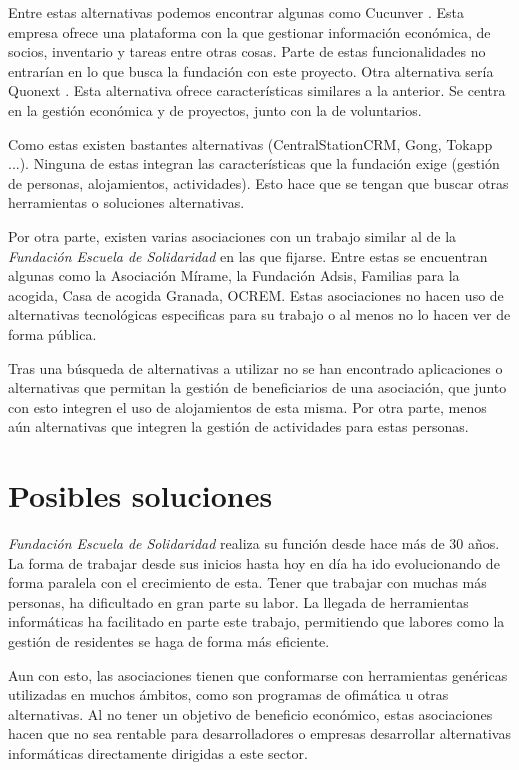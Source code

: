 Entre estas alternativas podemos encontrar algunas como Cucunver \cite{cucunver}. Esta empresa ofrece una plataforma con la que gestionar información económica, de socios, inventario y tareas entre otras cosas. Parte de estas funcionalidades no entrarían en lo que busca la fundación con este proyecto. Otra alternativa sería Quonext \cite{quonext}. Esta alternativa ofrece características similares a la anterior. Se centra en la gestión económica y de proyectos, junto con la de voluntarios.

Como estas existen bastantes alternativas (CentralStationCRM, Gong, Tokapp ...). Ninguna de estas integran las características que la fundación exige (gestión de personas, alojamientos, actividades). Esto hace que se tengan que buscar otras herramientas o soluciones alternativas. 

Por otra parte, existen varias asociaciones con un trabajo similar al de la \textit{Fundación Escuela de Solidaridad} en las que fijarse. Entre estas se encuentran algunas como la Asociación Mírame, la Fundación Adsis, Familias para la acogida, Casa de acogida Granada, OCREM. Estas asociaciones no hacen uso de alternativas tecnológicas especificas para su trabajo o al menos no lo hacen ver de forma pública. 

Tras una búsqueda de alternativas a utilizar no se han encontrado aplicaciones o alternativas que permitan la gestión de beneficiarios de una asociación, que junto con esto integren el uso de alojamientos de esta misma. Por otra parte, menos aún alternativas que integren la gestión de actividades para estas personas.

\section{Posibles soluciones}

\textit{Fundación Escuela de Solidaridad} realiza su función desde hace más de 30 años. La forma de trabajar desde sus inicios hasta hoy en día ha ido evolucionando de forma paralela con el crecimiento de esta. Tener que trabajar con muchas más personas, ha dificultado en gran parte su labor. La llegada de herramientas informáticas ha facilitado en parte este trabajo, permitiendo que labores como la gestión de residentes se haga de forma más eficiente. 

Aun con esto, las asociaciones tienen que conformarse con herramientas genéricas utilizadas en muchos ámbitos, como son programas de ofimática u otras alternativas. Al no tener un objetivo de beneficio económico, estas asociaciones hacen que no sea rentable para desarrolladores o empresas desarrollar alternativas informáticas directamente dirigidas a este sector. 

